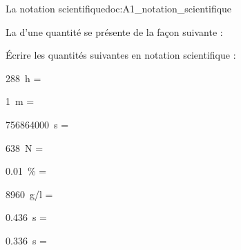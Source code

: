 \begin{doc}{La notation scientifique}{doc:A1_notation_scientifique}
  \begin{importants}
  La  d'une quantité se présente de la façon suivante :
  \begin{center}
    \hspace{5pt}
    \qq{}
  \end{center}
  \vspace*{-32pt}
  \end{importants}
\end{doc}

\numeroQuestion Écrire les quantités suivantes en notation scientifique :
\vspace*{-8pt}
\begin{listePoints}[2]
  \item \qty{288}{\hour}      = 
  \item \qty{1}{\m}           = 
  \item \qty{756 864 000}{\s} = 
  \item \qty{638}{\newton}    = 
  \item \qty{0,01}{\percent}  = 
  \item \qty{8960}{\g/\l}     = 
  \item \qty{0,436}{\s}       = 
  \item \qty{0,336}{\s}       = 
\end{listePoints}
\vspace*{-16pt}

